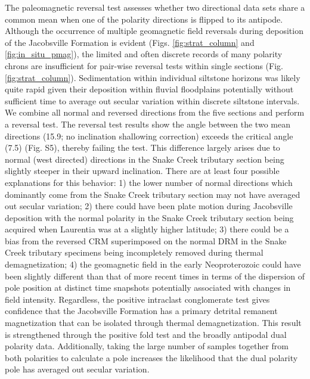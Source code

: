 The paleomagnetic reversal test assesses whether two directional data sets share a common mean when one of the polarity directions is flipped to its antipode. Although the occurrence of multiple geomagnetic field reversals during deposition of the Jacobsville Formation is evident (Figs. \ref{fig:strat_column} and \ref{fig:in_situ_pmag}), the limited and often discrete records of many polarity chrons are insufficient for pair-wise reversal tests within single sections (Fig. \ref{fig:strat_column}). Sedimentation within individual siltstone horizons was likely quite rapid given their deposition within fluvial floodplains potentially without sufficient time to average out secular variation within discrete siltstone intervals. We combine all normal and reversed directions from the five sections and perform a reversal test. The \cite{McFadden1990a} reversal test results show the angle between the two mean directions (15.9\textdegree; no inclination shallowing correction) exceeds the critical angle (7.5\textdegree) (Fig. S5), thereby failing the test. This difference largely arises due to normal (west directed) directions in the Snake Creek tributary section being slightly steeper in their upward inclination. There are at least four possible explanations for this behavior: 1) the lower number of normal directions which dominantly come from the Snake Creek tributary section may not have averaged out secular variation; 2) there could have been plate motion during Jacobsville deposition with the normal polarity in the Snake Creek tributary section being acquired when Laurentia was at a slightly higher latitude; 3) there could be a bias from the reversed CRM superimposed on the normal DRM in the Snake Creek tributary specimens being incompletely removed during thermal demagnetization; 4) the geomagnetic field in the early Neoproterozoic could have been slightly different than that of more recent times in terms of the dispersion of pole position at distinct time snapshots potentially associated with changes in field intensity. Regardless, the positive intraclast conglomerate test gives confidence that the Jacobsville Formation has a primary detrital remanent magnetization that can be isolated through thermal demagnetization. This result is strengthened through the positive fold test and the broadly antipodal dual polarity data. Additionally, taking the large number of samples together from both polarities to calculate a pole increases the likelihood that the dual polarity pole has averaged out secular variation.

